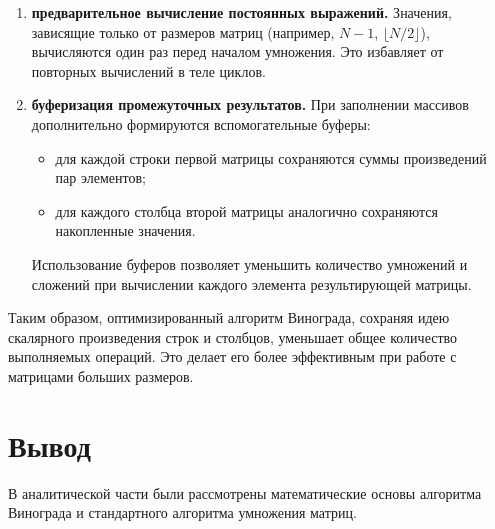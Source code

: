 \begin{enumerate}
	\item \textbf{предварительное вычисление постоянных выражений.}  
	Значения, зависящие только от размеров матриц (например, $N-1$, $\lfloor N/2 \rfloor$), вычисляются один раз перед началом умножения. Это избавляет от повторных вычислений в теле циклов.
	
	\item \textbf{буферизация промежуточных результатов.}  
	При заполнении массивов дополнительно формируются вспомогательные буферы:  
	\begin{itemize}
		\item для каждой строки первой матрицы сохраняются суммы произведений пар элементов;
		\item для каждого столбца второй матрицы аналогично сохраняются накопленные значения.
	\end{itemize}
	Использование буферов позволяет уменьшить количество умножений и сложений при вычислении каждого элемента результирующей матрицы.
\end{enumerate}

Таким образом, оптимизированный алгоритм Винограда, сохраняя идею скалярного произведения строк и столбцов, уменьшает общее количество выполняемых операций. Это делает его более эффективным при работе с матрицами больших размеров.

\section*{Вывод}

В аналитической части были рассмотрены математические основы алгоритма Винограда и стандартного алгоритма умножения матриц.

\clearpage

